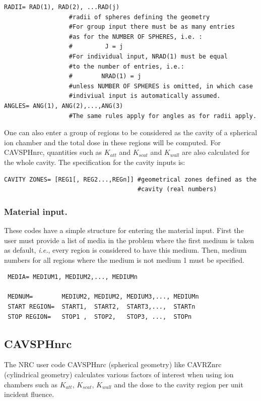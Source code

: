 \documentclass[12pt,twoside]{article}  %
\newcommand{\ie}{{\em i.e.}}
\begin{document}
\begin{verbatim}
RADII= RAD(1), RAD(2), ...RAD(j)
                  #radii of spheres defining the geometry
                  #For group input there must be as many entries
                  #as for the NUMBER OF SPHERES, i.e. :
                  #         J = j
                  #For individual input, NRAD(1) must be equal
                  #to the number of entries, i.e.:
                  #        NRAD(1) = j
                  #unless NUMBER OF SPHERES is omitted, in which case
                  #indiviual input is automatically assumed.
ANGLES= ANG(1), ANG(2),...,ANG(3)
                  #The same rules apply for angles as for radii apply.
\end{verbatim}

One can also enter a group of regions to be considered as the cavity
of a spherical ion chamber and the total dose in these regions will
be computed. For CAVSPHnrc, quantities such as
$K_{att}$ and $K_{scat}$ and $K_{wall}$ are also calculated for the
whole cavity. The specification for the cavity inputs is:
\begin{verbatim}
CAVITY ZONES= [REG1[, REG2...,REGn]] #geometrical zones defined as the
                                     #cavity (real numbers)
\end{verbatim}

\subsubsection{Material input.}

These codes have a simple structure for entering the material input. First
the user must provide a list of media in the problem where the first
medium is taken as default, \ie, every region is considered to have this
medium. Then, medium numbers for all regions where the medium is not
medium 1 must be specified.


\begin{verbatim}
 MEDIA= MEDIUM1, MEDIUM2,..., MEDIUMn

 MEDNUM=        MEDIUM2, MEDIUM2, MEDIUM3,..., MEDIUMn
 START REGION=  START1,  START2,  START3,...,  STARTn
 STOP REGION=   STOP1 ,  STOP2,   STOP3, ...,  STOPn

\end{verbatim}

\subsection{CAVSPHnrc}
The NRC user code CAVSPHnrc (spherical geometry) like CAVRZnrc
(cylindrical geometry) calculates various factors of interest when using
ion chambers such as $K_{att}$, $K_{scat}$, $K_{wall}$ and the dose to the
cavity region per unit incident fluence.
\end{document}
